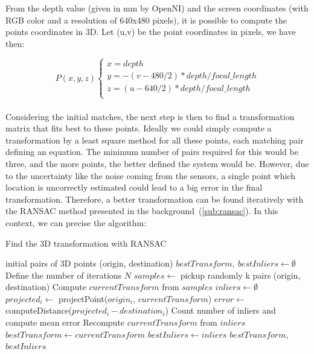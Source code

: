 From the depth value (given in mm by OpenNI) and the screen coordinates (with RGB color and a resolution of 640x480 pixels), it is possible to compute the points coordinates in 3D. Let (u,v) be the point coordinates in pixels, we have then:

\[
P(x,y,z)\left\{
\begin{array}{l}
x = depth \\
y = -(v - 480/2) * depth / focal\_length \\
z = (u - 640/2) * depth / focal\_length \\
\end{array}
\right.
\]

\paragraph{}
Considering the initial matches, the next step is then to find a transformation matrix that fits best to these points. Ideally we could simply compute a transformation by a least square method for all these points, each matching pair defining an equation. The minimum number of pairs required for this would be three, and the more points, the better defined the system would be. However, due to the uncertainty like the noise coming from the sensors, a single point which location is uncorrectly estimated could lead to a big error in the final transformation. Therefore, a better transformation can be found iteratively with the \gls{RANSAC} method presented in the background~(\ref{sub:ransac}). In this context, we can precise the algorithm:

\begin{algorithm}[H]
\caption{Find the 3D transformation with RANSAC}
\begin{algorithmic}
\REQUIRE initial pairs of 3D points (origin, destination)
\STATE $bestTransform,\:bestInliers \gets \emptyset$
\STATE Define the number of iterations $N$
 \STATE $samples \gets$ pickup randomly k pairs (origin, destination)
 \STATE Compute $currentTransform$ from $samples$
 \STATE $inliers \gets \emptyset$
  \STATE $projected_i \gets$ projectPoint($origin_i$, $currentTransform$)
  \STATE $error \gets$ computeDistance($projected_i - destination_i$)
  \ENDIF
 \ENDFOR
 \STATE Count number of inliers and compute mean error
  \STATE Recompute $currentTransform$ from $inliers$
   \STATE $bestTransform \gets currentTransform$
   \STATE $bestInliers \gets inliers$
  \ENDIF
 \ENDIF
\ENDFOR
\RETURN $bestTransform$, $bestInliers$
\end{algorithmic}
\end{algorithm}

